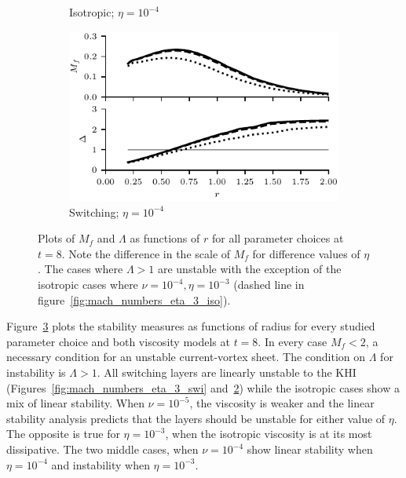 \begin{figure}[t]
\begin{subfigure}{0.49\textwidth}
      \caption{Isotropic; $\eta = 10^{-4}$}%
      \label{fig:mach_numbers_eta_4_iso}
    \end{subfigure}
    \hfill
    \begin{subfigure}{0.49\textwidth}
      \centering
  \includegraphics[width=1.0\linewidth]{param_study/mach_numbers_eta_4_swi.pdf}
      \caption{Switching; $\eta = 10^{-4}$}%
      \label{fig:mach_numbers_eta_4_swi}
    \end{subfigure}

  \caption{Plots of $M_f$ and $\Lambda$ as functions of $r$ for all parameter choices at $t=8$. Note the difference in the scale of $M_f$ for difference values of $\eta$. The cases where $\Lambda > 1$ are unstable with the exception of the isotropic cases where $\nu=10^{-4},\eta=10^{-3}$ (dashed line in figure~\ref{fig:mach_numbers_eta_3_iso}).}%
  \label{fig:mach_numbers}
\end{figure}

Figure~\ref{fig:mach_numbers} plots the stability measures as functions of radius for every studied parameter choice and both viscosity models at $t=8$. In every case $M_f < 2$, a necessary condition for an unstable current-vortex sheet. The condition on $\Lambda$ for instability is $\Lambda > 1$. All switching layers are linearly unstable to the KHI (Figures~\ref{fig:mach_numbers_eta_3_swi} and~\ref{fig:mach_numbers_eta_4_swi}) while the isotropic cases show a mix of linear stability. When $\nu = 10^{-5}$, the viscosity is weaker and the linear stability analysis predicts that the layers should be unstable for either value of $\eta$. The opposite is true for $\eta=10^{-3}$, when the isotropic viscosity is at its most dissipative. The two middle cases, when $\nu=10^{-4}$ show linear stability when $\eta=10^{-4}$ and instability when $\eta=10^{-3}$.

